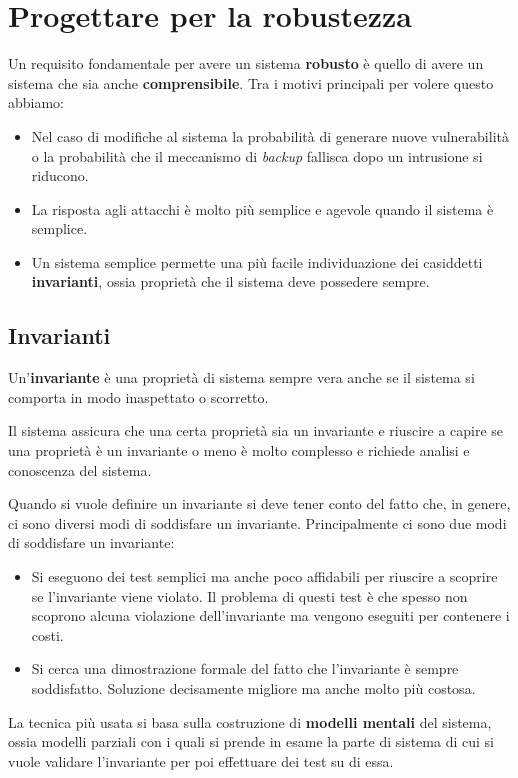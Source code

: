 \section{Progettare per la robustezza}
Un requisito fondamentale per avere un sistema \textbf{robusto} è quello di avere un sistema che sia anche
\textbf{comprensibile}. Tra i motivi principali per volere questo abbiamo:
\begin{itemize}
	\item Nel caso di modifiche al sistema la probabilità di generare nuove vulnerabilità o la probabilità che il
	      meccanismo di \emph{backup} fallisca dopo un intrusione si riducono.
	\item La risposta agli attacchi è molto più semplice e agevole quando il sistema è semplice.
	\item Un sistema semplice permette una più facile individuazione dei casiddetti \textbf{invarianti}, ossia
	      proprietà che il sistema deve possedere sempre.
\end{itemize}

\subsection{Invarianti}
Un'\textbf{invariante} è una proprietà di sistema sempre vera anche se il sistema si comporta in modo inaspettato o
scorretto.

Il sistema assicura che una certa proprietà sia un invariante e riuscire a capire se una proprietà è un invariante
o meno è molto complesso e richiede analisi e conoscenza del sistema.

Quando si vuole definire un invariante si deve tener conto del fatto che, in genere, ci sono diversi modi di soddisfare
un invariante. Principalmente ci sono due modi di soddisfare un invariante:
\begin{itemize}
	\item Si eseguono dei test semplici ma anche poco affidabili per riuscire a scoprire se l'invariante viene violato.
	      Il problema di questi test è che spesso non scoprono alcuna violazione dell'invariante ma vengono eseguiti
	      per contenere i costi.
	\item Si cerca una dimostrazione formale del fatto che l'invariante è sempre soddisfatto. Soluzione decisamente
	      migliore ma anche molto più costosa.
\end{itemize}
La tecnica più usata si basa sulla costruzione di \textbf{modelli mentali} del sistema, ossia modelli parziali con i
quali si prende in esame la parte di sistema di cui si vuole validare l'invariante per poi effettuare dei test su di
essa.


